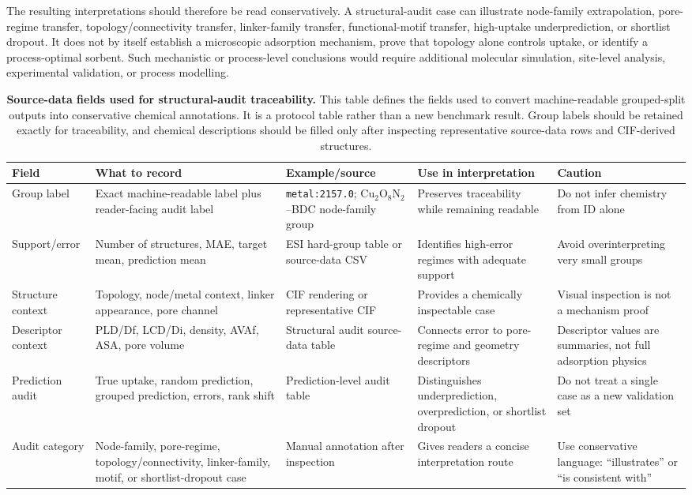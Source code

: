 \documentclass[11pt,a4paper]{article}
\begin{document}
The resulting interpretations should therefore be read conservatively. A structural-audit case can illustrate node-family extrapolation, pore-regime transfer, topology/connectivity transfer, linker-family transfer, functional-motif transfer, high-uptake underprediction, or shortlist dropout. It does not by itself establish a microscopic adsorption mechanism, prove that topology alone controls uptake, or identify a process-optimal sorbent. Such mechanistic or process-level conclusions would require additional molecular simulation, site-level analysis, experimental validation, or process modelling.




\begin{table}[H]
\centering
\small
\setlength{\tabcolsep}{3pt}
\caption{\textbf{Source-data fields used for structural-audit traceability.}
This table defines the fields used to convert machine-readable grouped-split outputs into conservative chemical annotations. It is a protocol table rather than a new benchmark result. Group labels should be retained exactly for traceability, and chemical descriptions should be filled only after inspecting representative source-data rows and CIF-derived structures.}
\begin{tabular}{p{} p{} p{} p{} p{}}
\toprule
\textbf{Field} & \textbf{What to record} & \textbf{Example/source} & \textbf{Use in interpretation} & \textbf{Caution} \\
\midrule
Group label & Exact machine-readable label plus reader-facing audit label & \texttt{metal:2157.0}; Cu$_2$O$_8$N$_2$--BDC node-family group & Preserves traceability while remaining readable & Do not infer chemistry from ID alone \\
Support/error & Number of structures, MAE, target mean, prediction mean & ESI hard-group table or source-data CSV & Identifies high-error regimes with adequate support & Avoid overinterpreting very small groups \\
Structure context & Topology, node/metal context, linker appearance, pore channel & CIF rendering or representative CIF & Provides a chemically inspectable case & Visual inspection is not a mechanism proof \\
Descriptor context & PLD/Df, LCD/Di, density, AVAf, ASA, pore volume & Structural audit source-data table & Connects error to pore-regime and geometry descriptors & Descriptor values are summaries, not full adsorption physics \\
Prediction audit & True uptake, random prediction, grouped prediction, errors, rank shift & Prediction-level audit table & Distinguishes underprediction, overprediction, or shortlist dropout & Do not treat a single case as a new validation set \\
Audit category & Node-family, pore-regime, topology/connectivity, linker-family, motif, or shortlist-dropout case & Manual annotation after inspection & Gives readers a concise interpretation route & Use conservative language: ``illustrates'' or ``is consistent with'' \\
\bottomrule
\end{tabular}
\label{tab:manual_audit_worksheet}
\end{table}

\clearpage


\end{document}
